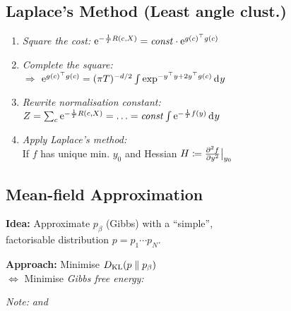 \subsection{Laplace's Method \quad\normalfont\sffamily (Least angle clust.)}

\begin{enumerate}
    \item \textit{Square the cost:}\quad
        $\mathrm{e}^{-\frac1T R(c,X)} = \mathit{const} \cdot \mathrm{e}^{g(c)^\top g(c)}$
    \item \textit{Complete the square:}\quad
        \\
        $\Rightarrow$ $\eu^{g(c)^\top g(c)} = (\pi T)^{-d/2} \int \exp^{-y^\top y + 2 y^\top g(c)} \diff y$
    \item \textit{Rewrite normalisation constant:}\\
        $Z = \sum_c \eu^{-\frac1T R(c,X)} = \ldots = \mathit{const} \int \eu^{-\frac1T f(y)} \diff y$
    \item \textit{Apply Laplace's method:}\\\vspace{-3pt}
        If $f$ has unique min. $y_0$ and Hessian $H\coloneqq \pderiv[2]{f}{y}\big\vert_{y_0}$\\\vspace{-4pt}
\end{enumerate}


\subsection{Mean-field Approximation}

\textbf{Idea:}\enskip
Approximate $p_\beta$ (Gibbs) with a ``simple'', \\\enskip
factorisable distribution $p = p_1 \cdots p_N$.

\textbf{Approach:}\enskip
Minimise $D_\mathrm{KL}(p\parallel p_\beta)$\\
$\iff$ Minimise \emph{Gibbs free energy:}\\
\hfill {}

\quad \textit{Note:}\enskip
{} \enskip \textit{and} \enskip {}

